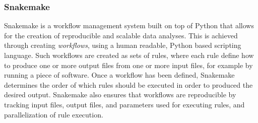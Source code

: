 \subsubsection{Snakemake} \label{background:snakemake}
Snakemake \cite{snakemake} is a workflow management system built on top of Python that allows for the creation of reproducible and scalable data analyses.
This is achieved through creating \textit{workflows}, using a human readable, Python based scripting language.
Such workflows are created as sets of rules, where each rule define how to produce one or more output files from one or more input files, for example by running a piece of software.
Once a workflow has been defined, Snakemake determines the order of which rules should be executed in order to produced the desired output.
Snakemake also ensures that workflows are reproducible by tracking input files, output files, and parameters used for executing rules, and parallelization of rule execution.


